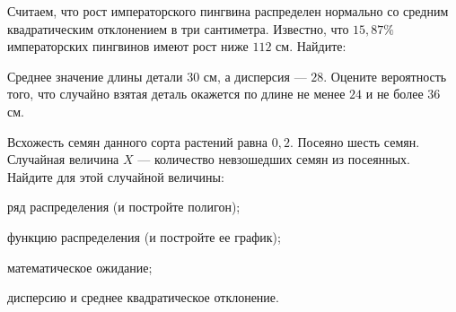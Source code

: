 \vfil

\begin{zkrPlain}{25}\noindent 
	Считаем, что рост императорского пингвина распределен нормально со средним квадратическим отклонением в три сантиметра. Известно, что $15{,}87\%$ императорских пингвинов имеют рост ниже $112$ см. Найдите: \par {}
 
\end{zkrPlain}

\vfil

\begin{zkrPlain}{25}\noindent 
	Среднее значение длины детали $ 30 $ см, а дисперсия --- $ 28 $. Оцените вероятность того, что случайно взятая деталь окажется по длине не менее $ 24 $ и не более $ 36 $ см.
 
\end{zkrPlain}

\newpage\setcounter{zad}{0}\setcounter{footnote}{0}



\begin{zkrPlain}{25}\noindent 
	Всхожесть семян данного сорта растений равна $0{,}2$. Посеяно шесть семян. Случайная величина $X$ --- количество невзошедших семян из посеянных. Найдите для этой случайной величины: \par \smallskip\small{ \par \zz ряд распределения (и постройте полигон); \par \zz функцию распределения (и постройте ее график); \par \zz математическое ожидание; \par \zz дисперсию и среднее квадратическое отклонение.\par \par}
 
\end{zkrPlain}

\vfil

